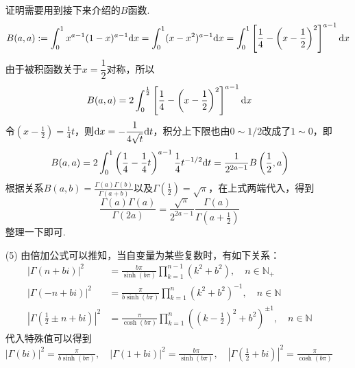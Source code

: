 \documentclass[UTF8]{ctexart}
\newcommand{\trm}[1]{{\rm #1}}
\begin{document}
\begin{itemize}
{        证明需要用到接下来介绍的\(B\)函数.
        \[B(a,a) := \int_{0}^{1}x^{a-1}(1-x)^{a-1} \trm{d}x = \int_0^1 (x-x^2)^{a-1} \trm{d}x = \int_0^1 \left[\frac{1}{4} - \left(x-\frac{1}{2}\right)^2\right]^{a-1}\trm{d}x \]
        由于被积函数关于\(x=\dfrac{1}{2}\)对称，所以
        \[B(a,a)=2\int_0^{\frac{1}{2}} \left[\frac{1}{4} - \left(x-\frac{1}{2}\right)^2\right]^{a-1}\trm{d}x\]
        令\(\displaystyle{\left(x-\frac{1}{2}\right) = \frac{1}{4}t}\)，则\(\displaystyle{\trm{d}x = -\frac{1}{4\sqrt{t}}\trm{d}t}\)，积分上下限也由\(0\sim 1/2\)改成了\(1 \sim 0\)，即
        \[B(a,a) = 2\int_0^1 \left(\frac{1}{4}-\frac{1}{4}t\right)^{a-1}\frac{1}{4}t^{-1/2}\trm{d}t = \frac{1}{2^{2a-1}}B\left(\frac{1}{2},a\right)\]
        根据关系\(\displaystyle{B(a,b) = \frac{\Gamma(a)\Gamma(b)}{\Gamma(a+b)}}\)以及\(\displaystyle{\Gamma\left(\frac{1}{2}\right) = \sqrt{\pi}}\)，在上式两端代入，得到
        \[\frac{\Gamma(a)\Gamma(a)}{\Gamma(2a)} = \frac{\sqrt{\pi}}{2^{2a-1}}\frac{\Gamma(a)}{\Gamma\left(a+\frac{1}{2}\right)}\]
        整理一下即可.
    }
    \item[(5)] 由倍加公式可以推知，当自变量为某些复数时，有如下关系：
    \begin{align*}
        |\Gamma(n+bi)|^2 &= \frac{b\pi}{\sinh(b\pi)}\prod_{k=1}^{n-1} (k^2+b^2), \quad n \in \mathbb{N}_+ \\
        |\Gamma(-n+bi)|^2 &= \frac{\pi}{b\sinh(b\pi)}\prod_{k=1}^{n} (k^2+b^2)^{-1}, \quad n \in \mathbb{N} \\
        |\Gamma(\frac{1}{2} \pm n + bi)|^2 &= \frac{\pi}{\cosh(b\pi)}\prod_{k=1}^n \left((k-\frac{1}{2})^2+b^2\right)^{\pm 1}, \quad n \in \mathbb{N}
    \end{align*}
    代入特殊值可以得到\(\displaystyle{|\Gamma(bi)|^2 = \frac{\pi}{b \sinh (b\pi)}, \quad |\Gamma(1+bi)|^2 = \frac{b\pi}{\sinh(b\pi)}, \quad |\Gamma(\frac{1}{2}+bi)|^2 = \frac{\pi}{\cosh(b\pi)}}\)
\end{itemize}

\vspace{1cm}

\end{document}
